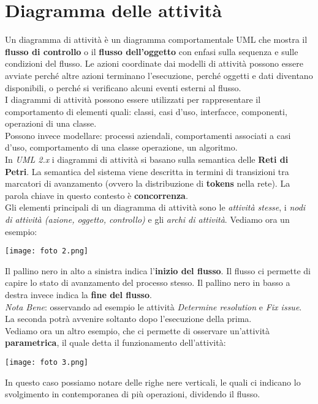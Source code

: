 \documentclass{article}
\begin{document}
\pagestyle{empty}

\section*{Diagramma delle attività}
\large

Un diagramma di attività è un diagramma comportamentale UML che mostra il \textbf{flusso di controllo} o il \textbf{flusso dell'oggetto} con enfasi sulla sequenza e sulle condizioni del flusso.
Le azioni coordinate dai modelli di attività possono essere avviate perché altre azioni terminano l'esecuzione, perché oggetti e dati diventano disponibili, o perché si verificano alcuni eventi esterni al flusso.\vspace{14pt}\\
I diagrammi di attività possono essere utilizzati per rappresentare il comportamento di elementi quali: classi, casi d'uso, interfacce, componenti, operazioni di una classe.\\
Possono invece modellare: processi aziendali, comportamenti associati a casi d'uso, comportamento di una classe operazione, un algoritmo.\vspace{14pt}\\
In \textit{UML 2.x} i diagrammi di attività si basano sulla semantica delle \textbf{Reti di Petri}. La semantica del sistema viene descritta in termini di transizioni tra marcatori di avanzamento (ovvero la distribuzione di \textbf{tokens} nella rete). La parola chiave in questo contesto è \textbf{concorrenza}.\vspace{14pt}\\
Gli elementi principali di un diagramma di attività sono le \textit{attività stesse}, i \textit{nodi di attività (azione, oggetto, controllo)} e gli \textit{archi di attività}. Vediamo ora un esempio:
\begin{center}
    \texttt{[image: foto 2.png]}
\end{center}
Il pallino nero in alto a sinistra indica l'\textbf{inizio del flusso}. Il flusso ci permette di capire lo stato di avanzamento del processo stesso. Il pallino nero in basso a destra invece indica la \textbf{fine del flusso}.\\
\textit{Nota Bene}: osservando ad esempio le attività \textit{Determine resolution} e \textit{Fix issue}. La seconda potrà avvenire soltanto dopo l'esecuzione della prima.\\
Vediamo ora un altro esempio, che ci permette di osservare un'attività \textbf{parametrica}, il quale detta il funzionamento dell'attività:
\begin{center}
    \texttt{[image: foto 3.png]}
\end{center}
In questo caso possiamo notare delle righe nere verticali, le quali ci indicano lo svolgimento in contemporanea di più operazioni, dividendo il flusso.\vspace{14pt}\\
\end{document}
